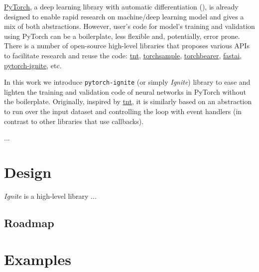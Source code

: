 \documentclass{article}
\begin{document}
\href{https://github.com/pytorch/pytorch}{PyTorch}, a deep learning library with automatic differentiation (\cite{paszke2017automatic}), is already designed 
to enable rapid research on machine/deep learning model and gives a mix of both abstractions. However, user's code for model's training and validation 
using PyTorch can be a boilerplate, less flexible and, potentially, error prone. There is a number of 
open-source high-level libraries that proposes various APIs to facilitate research and reuse the code: \href{https://github.com/pytorch/tnt/}{tnt}, \href{https://github.com/ncullen93/torchsample}{torchsample}, 
\href{https://github.com/ecs-vlc/torchbearer}{torchbearer}, \href{https://github.com/fastai/fastai}{fastai}, 
\href{https://github.com/pytorch/ignite}{pytorch-ignite}, etc.

In this work we introduce \texttt{pytorch-ignite} (or simply \emph{Ignite}) library to ease and lighten the training and validation code of neural networks 
in PyTorch without the boilerplate. Originally, inspired by \href{https://github.com/pytorch/tnt/}{tnt}, it is similarly based on an abstraction to run over 
the input dataset and controlling the loop with event handlers (in contrast to other libraries that use callbacks).

...

\section{Design}

\emph{Ignite} is a high-level library ...


\subsection{Roadmap}




\section{Examples}
\end{document}
